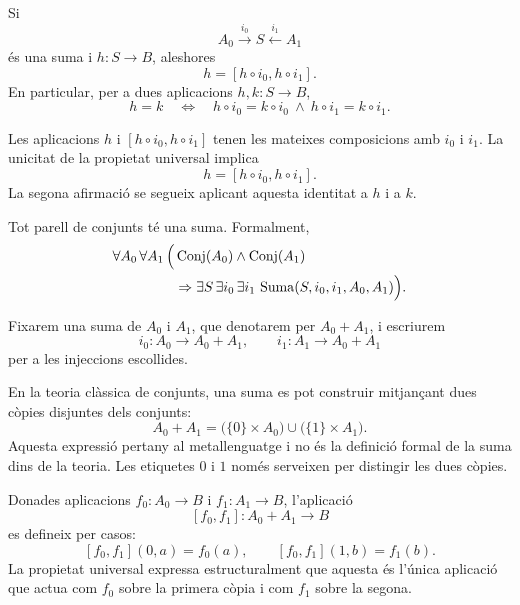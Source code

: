 \begin{proposicio}\label{prop:extensionalitat-suma}
Si
\[
A_0\xrightarrow{i_0}S\xleftarrow{i_1}A_1
\]
és una suma i \(h:S\to B\), aleshores
\[
h=[h\circ i_0,h\circ i_1].
\]
En particular, per a dues aplicacions \(h,k:S\to B\),
\[
h=k
\quad\Longleftrightarrow\quad
h\circ i_0=k\circ i_0
\ \land\ 
h\circ i_1=k\circ i_1.
\]
\end{proposicio}

\begin{prova}
Les aplicacions \(h\) i \([h\circ i_0,h\circ i_1]\) tenen les mateixes composicions amb \(i_0\) i \(i_1\). La unicitat de la propietat universal implica
\[
h=[h\circ i_0,h\circ i_1].
\]
La segona afirmació se segueix aplicant aquesta identitat a \(h\) i a \(k\).
\end{prova}



\begin{axioma}\label{ax:sumes}
Tot parell de conjunts té una suma. Formalment,
\[
\begin{aligned}
\forall A_0\,\forall A_1\,\Bigl(&
\operatorname{Conj}(A_0)\land\operatorname{Conj}(A_1)
\\
&{}\Rightarrow
\exists S\,\exists i_0\,\exists i_1\,
\operatorname{Suma}(S,i_0,i_1,A_0,A_1)
\Bigr).
\end{aligned}
\]
\end{axioma}

\begin{notacio}\label{not:suma-escollida}
Fixarem una suma de \(A_0\) i \(A_1\), que denotarem per \(A_0+A_1\), i escriurem
\[
i_0:A_0\to A_0+A_1,
\qquad
i_1:A_1\to A_0+A_1
\]
per a les injeccions escollides.
\end{notacio}

\begin{observacio}\label{ex:suma-classica}
En la teoria clàssica de conjunts, una suma es pot construir mitjançant dues còpies disjuntes dels conjunts:
\[
A_0+A_1
=
\bigl(\{0\}\times A_0\bigr)
\cup
\bigl(\{1\}\times A_1\bigr).
\]
Aquesta expressió pertany al metallenguatge i no és la definició formal de la suma dins de la teoria. Les etiquetes \(0\) i \(1\) només serveixen per distingir les dues còpies.

Donades aplicacions \(f_0:A_0\to B\) i \(f_1:A_1\to B\), l'aplicació
\[
[f_0,f_1]:A_0+A_1\to B
\]
es defineix per casos:
\[
[f_0,f_1](0,a)=f_0(a),
\qquad
[f_0,f_1](1,b)=f_1(b).
\]
La propietat universal expressa estructuralment que aquesta és l'única aplicació que actua com \(f_0\) sobre la primera còpia i com \(f_1\) sobre la segona.
\end{observacio}

